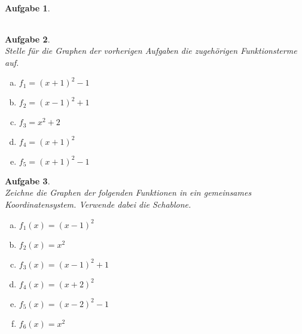 \documentclass[12pt]{article}
\theoremstyle{note}
\newtheorem{aufgabe}{Aufgabe}
\begin{document}
\begin{flushleft}
\begin{aufgabe}
\begin{minipage}{0.55\textwidth}
\begin{tabular}{c|c|c|c}
\end{tabular} 

\end{minipage} 

\end{aufgabe} 
\begin{aufgabe} ~ \\ 
Stelle f\"ur die Graphen der vorherigen Aufgaben die zugeh\"origen Funktionsterme auf. 
\begin{multicols}{3} 
\begin{enumerate}[a)] 
\item 
$f_1=\left(x + 1\right)^{2} - 1$
\item 
$f_2=\left(x - 1\right)^{2} + 1$
\item 
$f_3=x^{2} + 2$
\item 
$f_4=\left(x + 1\right)^{2}$
\item 
$f_5=\left(x + 1\right)^{2} - 1$
\end{enumerate} 
\end{multicols} 
\end{aufgabe} 
\begin{aufgabe} ~ \\ 
Zeichne die Graphen der folgenden Funktionen in ein gemeinsames Koordinatensystem. Verwende dabei die Schablone. 
\begin{multicols}{3} 
\begin{enumerate}[a)] 
\item 
$f_1(x)=\left(x - 1\right)^{2}$
\item 
$f_2(x)=x^{2}$
\item 
$f_3(x)=\left(x - 1\right)^{2} + 1$
\item 
$f_4(x)=\left(x + 2\right)^{2}$
\item 
$f_5(x)=\left(x - 2\right)^{2} - 1$
\item 
$f_6(x)=x^{2}$
\end{enumerate} 
\end{multicols} 
\end{aufgabe}
\end{flushleft}
\end{document}
